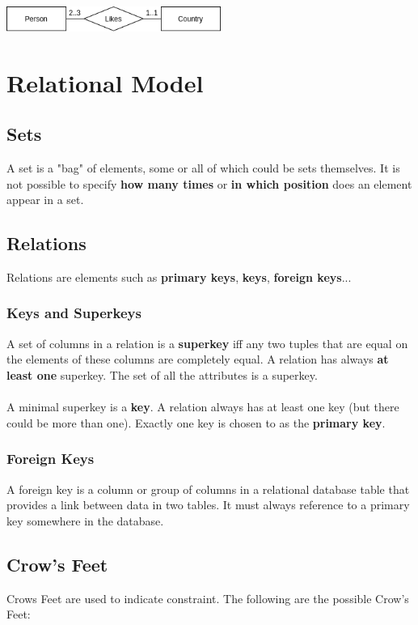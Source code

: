 \documentclass{article}
\begin{document}
\vspace{.6cm}
\centerline{\includegraphics[width=7cm]{./assets/look-across.png}}
\vspace{.2cm}

\section{Relational Model}
\subsection{Sets}
A set is a "bag" of elements, some or all of which could be sets themselves. It is not possible to specify \textbf{how many times} or \textbf{in which position} does an element appear in a set.

\subsection{Relations}
Relations are elements such as \textbf{primary keys}, \textbf{keys}, \textbf{foreign keys}...

\subsubsection{Keys and Superkeys}
A set of columns in a relation is a \textbf{superkey} iff any two tuples that are equal on the elements of these columns are completely equal. A relation has always \textbf{at least one} superkey. The set of all the attributes is a superkey. \\ \\
A minimal superkey is a \textbf{key}. A relation always has at least one key (but there could be more than one). Exactly one key is chosen to as the \textbf{primary key}.

\subsubsection{Foreign Keys}
A foreign key is a column or group of columns in a relational database table that provides a link between data in two tables. It must always reference to a primary key somewhere in the database.

\subsection{Crow's Feet}
Crows Feet are used to indicate constraint. The following are the possible Crow's Feet: \\ \\
\end{document}

